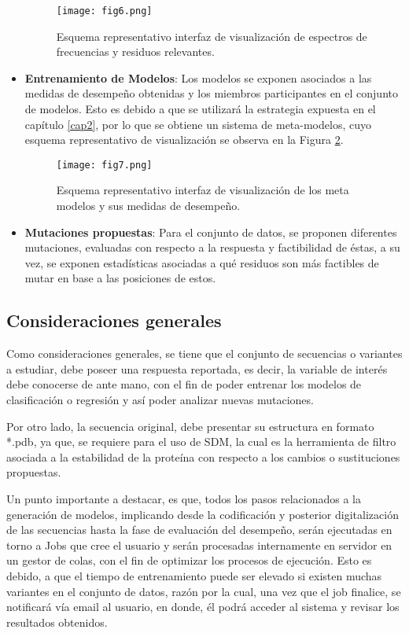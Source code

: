 \begin{itemize}
	\begin{figure}[!h]
		
		\centering
		\texttt{[image: fig6.png]}
		\caption{Esquema representativo interfaz de visualización de espectros de frecuencias y residuos relevantes.}
		\label{cap4:fig6}
	\end{figure}
	
	\item \textbf{Entrenamiento de Modelos}: Los modelos se exponen asociados a las medidas de desempeño obtenidas y los miembros participantes en el conjunto de modelos. Esto es debido a que se utilizará la estrategia expuesta en el capítulo \ref{cap2}, por lo que se obtiene un sistema de meta-modelos, cuyo esquema representativo de visualización se observa en la Figura \ref{cap4:fig7}. 
	
	\begin{figure}[!h]
		
		\centering
		\texttt{[image: fig7.png]}
		\caption{Esquema representativo interfaz de visualización de los meta modelos y sus medidas de desempeño.}
		\label{cap4:fig7}
	\end{figure}
	
	\item \textbf{Mutaciones propuestas}: Para el conjunto de datos, se proponen diferentes mutaciones, evaluadas con respecto a la respuesta y factibilidad de éstas, a su vez, se exponen estadísticas asociadas a qué residuos son más factibles de mutar en base a las posiciones de estos.
	
\end{itemize}


\subsection{Consideraciones generales}

Como consideraciones generales, se tiene que el conjunto de secuencias o variantes a estudiar, debe poseer una respuesta reportada, es decir, la variable de interés debe conocerse de ante mano, con el fin de poder entrenar los modelos de clasificación o regresión y así poder analizar nuevas mutaciones. 

Por otro lado, la secuencia original, debe presentar su estructura en formato *.pdb, ya que, se requiere para el uso de SDM, la cual es la herramienta de filtro asociada a la estabilidad de la proteína con respecto a los cambios o sustituciones propuestas.

Un punto importante a destacar, es que, todos los pasos relacionados a la generación de modelos, implicando desde la codificación y posterior digitalización de las secuencias hasta la fase de evaluación del desempeño, serán ejecutadas en torno a Jobs que cree el usuario y serán procesadas internamente en servidor en un gestor de colas, con el fin de optimizar los procesos de ejecución. Esto es debido, a que el tiempo de entrenamiento puede ser elevado si existen muchas variantes en el conjunto de datos, razón por la cual, una vez que el job finalice, se notificará vía email al usuario, en donde, él podrá acceder al sistema y revisar los resultados obtenidos.

